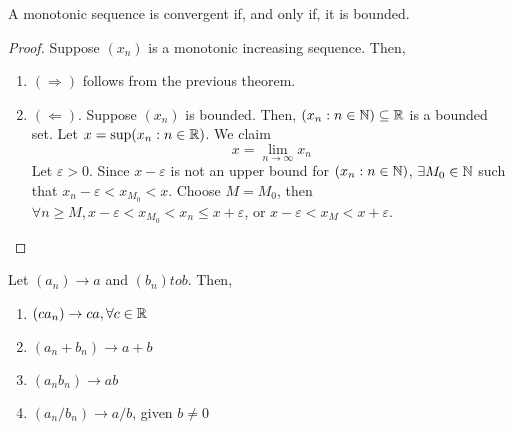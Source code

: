 \begin{theorem}
    A monotonic sequence is convergent if, and only if, it is bounded.
\end{theorem}

\begin{proof}
    Suppose $( x_n)$ is a monotonic increasing sequence. Then,
    \begin{enumerate}
        \item $( \Rightarrow )$ follows from the previous theorem.
        \item $( \Leftarrow )$. Suppose $ (x_n ) $ is bounded. Then, $ ( x_n: n \in \mathbb{N}) \subseteq \mathbb{R}$ is a bounded set. Let $x = \sup ( x_n: n \in \mathbb{R})$. We claim 
        \begin{equation*}
            x = \lim \limits_{n\to \infty} x_n
        \end{equation*}
        Let $\varepsilon > 0$. Since $x - \varepsilon$ is not an upper bound for $( x_n: n \in \mathbb{N})$, $\exists M_0 \in \mathbb{N}$ such that $x_n - \varepsilon < x_{M_0} < x$. Choose $M = M_0$, then $\forall n \geq M, x-\varepsilon < x_{M_0} < x_n \leq x + \varepsilon$, or $x-\varepsilon < x_M < x+\varepsilon$.
    \end{enumerate}
\end{proof}

\begin{theorem}
    Let $( a_n) \to a$ and $( b_n) to b$. Then,
    \begin{enumerate}
        \item $( ca_n) \to ca, \forall c \in \mathbb{R}$
        \item $( a_n + b_n) \to a + b$
        \item $( a_nb_n) \to ab $
        \item $(a_n/b_n) \to a/b$, given $b \ne 0$
    \end{enumerate}
\end{theorem}

